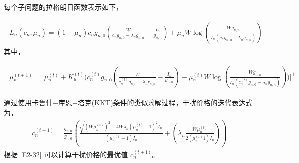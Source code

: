 每个子问题的拉格朗日函数表示如下，

\begin{eqnarray}\label{E2-30}
\begin{array}{lll}
\!\!\!\!\textit{L}_n(c_n, \mu_n)=(1-\mu_n)c_{n} g_{n,0}\left(\frac{W}{c_n g_{n,0}-\lambda_n g_{n,n}}-\frac{I_n}{g_{n,n}}\right)
+\mu_n W \log\left(\frac{W g_{n,n}}{I_n (c_n g_{n,0}-\lambda_n g_{n,n}) }\right)
\end{array}
\end{eqnarray}
其中，

\begin{eqnarray}\label{E2-31}
\begin{array}{lll}
\!\!\!\mu_n^{(t+1)}=\Big[\mu_n^{(t)}\!\!+\!K_{\mu}^{(t)}\big(c_{n}^{(t)} g_{n,0}(\frac{W}{c_n^{(t)} g_{n,0}-\lambda_n g_{n,n}}-\frac{I_n}{g_{n,n}})-\mu_n^{(t)} W \log(\frac{W g_{n,n}}{I_n (c_n^{(t)} g_{n,0}-\lambda_n g_{n,n}) })\big)\Big]^+
\end{array}
\end{eqnarray}

通过使用卡鲁什$-$库恩$-$塔克(KKT)条件的类似求解过程，干扰价格的迭代表达式为，
\begin{eqnarray}\label{E2-32}
 \begin{array}{lll}
c_n^{(t+1)}=\frac{g_{n,n}}{g_{n,0}}\left(\frac{ \sqrt{(W\mu_n^{(t)})^{2}-4W\lambda_n(\mu_n^{(t)}-1)^2I_n}}{(\mu_n^{(t)}-1)I_n}+(\lambda_n\frac{W\mu_n^{(t)}}{2(\mu_n^{(t)}1)I_n})\right)
\end{array}
\end{eqnarray}
根据 \eqref{E2-32} 可以计算干扰价格的最优值 $c_{n}^{(t+1)}$。

